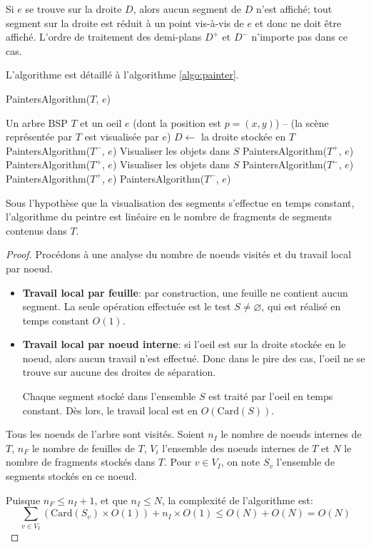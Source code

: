 

Si $e$ se trouve sur la droite $D$, alors aucun segment de $D$ n'est affiché;
tout segment sur la droite est réduit à un point vis-à-vis de $e$ et donc ne
doit être affiché. L'ordre de traitement des demi-plans $D^+$ et $D^-$ n'importe
pas dans ce cas.

L'algorithme est détaillé à l'algorithme \ref{algo:painter}.

\begin{algorithm}
  \caption{PaintersAlgorithm($T$, $e$)}
  \begin{algorithmic}[1] \label{algo:painter}
    \REQUIRE Un arbre BSP $T$ et un oeil $e$ (dont la position est $p=(x, y)$)
    \ENSURE -- (la scène représentée par $T$ est visualisée par $e$)
    \STATE $D\leftarrow$ la droite stockée en $T$
    \STATE PaintersAlgorithm($T^-$, $e$)
    \STATE Visualiser les objets dans $S$
    \STATE PaintersAlgorithm($T^+$, $e$)
    \STATE PaintersAlgorithm($T^+$, $e$)
    \STATE Visualiser les objets dans $S$
    \STATE PaintersAlgorithm($T^-$, $e$)
    \ELSE
    \STATE PaintersAlgorithm($T^+$, $e$)
    \STATE PaintersAlgorithm($T^-$, $e$)
    \ENDIF
    \ENDIF
  \end{algorithmic}
\end{algorithm}

\begin{prop}
  Sous l'hypothèse que la visualisation des segments s'effectue
  en temps constant, l'algorithme du peintre est linéaire en le
  nombre de fragments de segments contenus dans $T$.
\end{prop}
\begin{proof}
  Procédons à une analyse du nombre de noeuds visités et du travail local
  par noeud.
  \begin{itemize}
  \item \textbf{Travail local par feuille}: par construction, une feuille
    ne contient aucun segment. La seule opération effectuée est le test
    $S\neq \varnothing$, qui est réalisé en temps constant $O(1)$.
  \item \textbf{Travail local par noeud interne}: si l'oeil est sur la droite
    stockée en le noeud, alors aucun travail n'est effectué. Donc dans le
    pire des cas, l'oeil ne se trouve sur aucune des droites de séparation.

    Chaque segment stocké dans l'ensemble $S$ est traité par l'oeil en
    temps constant. Dès lors, le travail local est en $O(\mathrm{Card}(S))$.
  \end{itemize}
  Tous les noeuds de l'arbre sont visités. Soient $n_I$ le nombre de noeuds
  internes de $T$, $n_F$ le nombre de feuilles de $T$, $V_i$ l'ensemble des
  noeuds internes de $T$ et $N$ le nombre
  de fragments stockés dans $T$.
  Pour $v\in V_I$, on note $S_v$ l'ensemble de segments stockés en ce noeud.

  Puisque $n_F \leq n_I + 1$, et que $n_I\leq N$,
  la complexité de l'algorithme est:
  $$ \sum_{v\in V_I}\left(\mathrm{Card}(S_v)\times O(1)\right) +
  n_I \times O(1) \leq O(N) + O(N) = O(N)$$
\end{proof}

